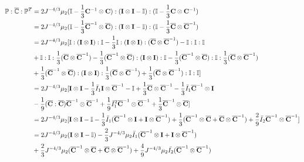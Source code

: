\begin{equation} \label{part11}
\begin{split}
\mathbb{P} : {\overline{\mathbb{C}}} : {\mathbb{P}}^T 
&= 2J^{-4/3}\mu_2 (\mathbb{I} - \frac{1}{3}{\bold{C}}^{-1} \otimes {\bold{C}})
: (\bold{I} \otimes \bold{I} - \mathbb{I}) : (\mathbb{I} - \frac{1}{3}\bold{C} \otimes {\bold{C}}^{-1}) \\
&= 2J^{-4/3}\mu_2 (\mathbb{I} - \frac{1}{3}{\overline{\bold{C}}}^{-1} \otimes \overline{\bold{C}})
: (\bold{I} \otimes \bold{I} - \mathbb{I}) : (\mathbb{I} - \frac{1}{3}\overline{\bold{C}} \otimes {\overline{\bold{C}}}^{-1}) \\
&= 2J^{-4/3}\mu_2 [\mathbb{I} : (\bold{I} \otimes \bold{I}) : \mathbb{I} - \frac{1}{3}\mathbb{I} : (\bold{I} \otimes \bold{I}) : (\overline{{\bold{C}}} \otimes {\overline{\bold{C}}}^{-1}) - \mathbb{I} : \mathbb{I} : \mathbb{I} \\
&+ \mathbb{I} : \mathbb{I} : \frac{1}{3}(\overline{\bold{C}} \otimes {\overline{\bold{C}}}^{-1}) - 
\frac{1}{3}({\overline{\bold{C}}}^{-1} \otimes \overline{\bold{C}} ) : (\bold{I} \otimes \bold{I}) : \mathbb{I}
- \frac{1}{3}({\overline{\bold{C}}}^{-1} \otimes \overline{\bold{C}} ) :  \mathbb{I} : \frac{1}{3}({\overline{\bold{C}}} \otimes {\overline{\bold{C}} }^{-1}) \\
&+ \frac{1}{3}(\overline{{\bold{C}}}^{-1} \otimes \overline{\bold{C}} ) : (\bold{I} \otimes \bold{I}) : \frac{1}{3}({\overline{\bold{C}}} \otimes {\overline{\bold{C}}}^{-1} ) + \frac{1}{3}({\overline{\bold{C}}} \otimes {\overline{\bold{C}}}^{-1}) : \mathbb{I} : \mathbb{I}
] \\
&= 2J^{-4/3}\mu_2[\bold{I} \otimes \bold{I} - \frac{1}{3}\bar{I}_1\bold{I} \otimes {\overline{\bold{C}}}^{-1} - \mathbb{I} + \frac{1}{3}\overline{\bold{C}} \otimes {\overline{\bold{C}}}^{-1} -  \frac{1}{3}\bar{I}_1{\overline{\bold{C}}}^{-1} \otimes \bold{I}\\
&- \frac{1}{9}(\overline{\bold{C}} : \overline{\bold{C}}){\overline{\bold{C}}}^{-1} \otimes {\overline{\bold{C}}}^{-1} + \frac{1}{9}{\bar{I}_1}^2{\overline{\bold{C}}}^{-1} \otimes {\overline{\bold{C}}}^{-1} +  \frac{1}{3}{\overline{\bold{C}}}^{-1} \otimes {\overline{\bold{C}}}] \\
&= 2{J}^{-4/3}\mu_2 [\bold{I} \otimes \bold{I} - \mathbb{I} - \frac{1}{3}\bar{I}_1({\overline{\bold{C}}}^{-1} \otimes \bold{I} + \bold{I}\otimes{\overline{\bold{C}}}^{-1} ) +
\frac{1}{3}({\overline{\bold{C}}}^{-1} \otimes \overline{\bold{C}} + \overline{\bold{C}}\otimes{\overline{\bold{C}}}^{-1} )  + \frac{2}{9}\bar{I}_2 {\overline{\bold{C}}}^{-1} \otimes {\overline{\bold{C}}}^{-1}] \\
&= 2{J}^{-4/3}\mu_2(\bold{I} \otimes \bold{I} - \mathbb{I}) - \frac{2}{3}J^{-4/3}\mu_2\bar{I}_1({\overline{\bold{C}}}^{-1} \otimes \bold{I} + \bold{I} \otimes {\overline{\bold{C}}}^{-1}) \\
&+
\frac{2}{3}J^{-4/3}\mu_2({\overline{\bold{C}}}^{-1} \otimes {\overline{\bold{C}}} + {\overline{\bold{C}}} \otimes {\overline{\bold{C}}}^{-1}) + \frac{4}{9}J^{-4/3}\mu_2\bar{I_2}({\overline{\bold{C}}}^{-1} \otimes {\overline{\bold{C}}}^{-1})
\end{split}
\end{equation}
